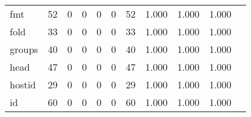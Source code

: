 \begin{longtable}{lp{1.20cm}p{1.20cm}p{1.20cm}p{1.20cm}p{1.20cm}p{1.20cm}p{1.20cm}p{1.20cm}p{1.20cm}p{1.20cm}}
fmt       &                                    52 &                                                  0 &                                                  0 &                                                  0 &                                                  0 &                                                 52 &                                         1.000 &                                              1.000 &                                              1.000 \\
fold      &                                    33 &                                                  0 &                                                  0 &                                                  0 &                                                  0 &                                                 33 &                                         1.000 &                                              1.000 &                                              1.000 \\
groups    &                                    40 &                                                  0 &                                                  0 &                                                  0 &                                                  0 &                                                 40 &                                         1.000 &                                              1.000 &                                              1.000 \\
head      &                                    47 &                                                  0 &                                                  0 &                                                  0 &                                                  0 &                                                 47 &                                         1.000 &                                              1.000 &                                              1.000 \\
hostid    &                                    29 &                                                  0 &                                                  0 &                                                  0 &                                                  0 &                                                 29 &                                         1.000 &                                              1.000 &                                              1.000 \\
id        &                                    60 &                                                  0 &                                                  0 &                                                  0 &                                                  0 &                                                 60 &                                         1.000 &                                              1.000 &                                              1.000 \\

\end{longtable}

